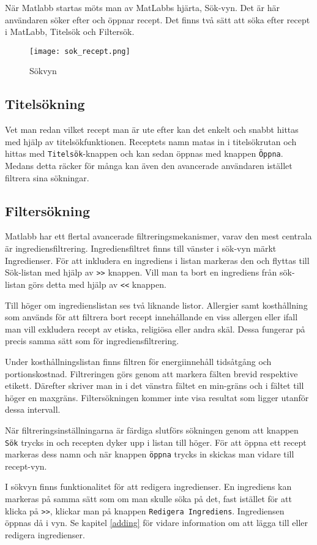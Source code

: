 När Matlabb startas möts man av MatLabbs hjärta, Sök-vyn. Det är här
användaren söker efter och öppnar recept. Det finns två sätt att söka
efter recept i MatLabb, Titelsök och Filtersök.

\begin{figure}[h]
        \centering 
        \texttt{[image: sok\_recept.png]} 
        \caption{Sökvyn} 
        \label{fig:sokvyn}
\end{figure}


\subsection{Titelsökning}
Vet man redan vilket recept man är ute efter kan det enkelt och snabbt
hittas med hjälp av titelsökfunktionen. Receptets namn matas in i
titelsökrutan och hittas med \verb+Titelsök+-knappen och kan sedan öppnas
med knappen \verb+Öppna+. Medans detta räcker för många kan även den
avancerade användaren istället filtrera sina sökningar.

\subsection{Filtersökning}

Matlabb har ett flertal avancerade filtreringsmekanismer, varav den
mest centrala är ingrediensfiltrering. Ingrediensfiltret finns till
vänster i sök-vyn märkt Ingredienser. För att inkludera en ingrediens
i listan markeras den och flyttas till Sök-listan med hjälp av \verb+>>+
knappen. Vill man ta bort en ingrediens från sök-listan görs detta med
hjälp av \verb+<<+ knappen.

Till höger om ingredienslistan ses två liknande listor. Allergier samt
kosthållning som används för att filtrera bort recept innehållande en
viss allergen eller ifall man vill exkludera recept av etiska,
religiösa eller andra skäl. Dessa fungerar på precis samma sätt som för
ingrediensfiltrering.

Under kosthållningslistan finns filtren för energiinnehåll tidsåtgång
och portionskostnad. Filtreringen görs genom att markera fälten brevid respektive etikett. Därefter skriver man in i det vänstra fältet en min-gräns och i fältet till höger en maxgräns. Filtersökningen kommer inte visa resultat som ligger utanför dessa intervall.

När filtreringsinställningarna är färdiga slutförs sökningen genom att
knappen \verb+Sök+ trycks in och recepten dyker upp i listan till
höger. För att öppna ett recept markeras dess namn och när
knappen \verb+öppna+ trycks in skickas man vidare till recept-vyn.

I sökvyn finns funktionalitet för att redigera ingredienser. En ingrediens kan markeras på samma sätt som om man skulle söka på det, fast istället för att klicka på \verb+>>+, klickar man på knappen \verb+Redigera Ingrediens+. Ingrediensen öppnas då i vyn. Se kapitel \ref{adding} för vidare information om att lägga till eller redigera ingredienser. 
